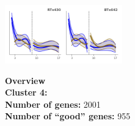 \begin{multicols}{2}
\includegraphics[width=2in]{figures/clusters/leaf_Preflowering_3.png}
\columnbreak

\noindent \textbf{Overview}\\\textbf{Cluster 4:}  \\
\textbf{Number of genes:} 2001 \\
\textbf{Number of ``good'' genes:} 955 \\
\end{multicols}

